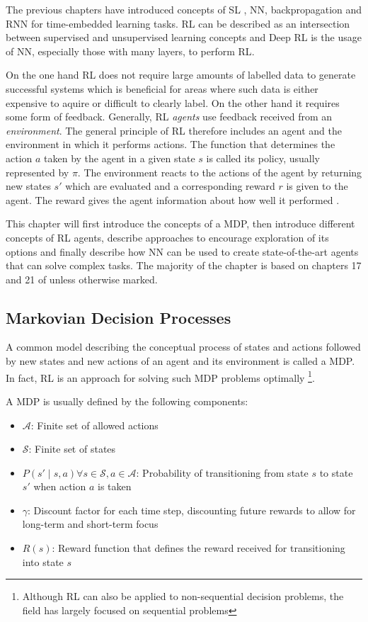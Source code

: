 The previous chapters have introduced concepts of \ac {SL} , \ac {NN}, backpropagation and \ac {RNN} for time-embedded
learning tasks. \ac {RL} can be described as an intersection between supervised and unsupervised learning concepts and
Deep \ac {RL} is the usage of \ac {NN}, especially those with many layers, to perform \ac {RL}.

On the one hand \ac {RL}  does not require large amounts of labelled data to generate successful systems which is
beneficial for areas where such data is either expensive to aquire or difficult to clearly label. On the other hand it
requires some form of feedback. Generally, \ac {RL} \emph{agents} use feedback received from an \emph{environment}.  The
general principle of \ac {RL} therefore includes an agent and the environment in which it performs actions. The function
that determines the action $a$  taken by the agent in a given state $s$ is called its policy, usually represented by
$\pi$.  The environment reacts to the actions of the agent by returning new states $s'$ which are evaluated and a
corresponding reward $r$ is given to the agent. The reward gives the agent information about how well it performed 
\citep[p.830f.]{russell2016artificial}.

This chapter will first introduce the concepts of a \ac {MDP}, then introduce different concepts of \ac {RL} agents,
describe approaches to encourage exploration of its options and finally describe how \ac {NN} can be used to create
state-of-the-art agents that can solve complex tasks. The majority of the chapter is based on
chapters 17 and 21 of \citet[]{russell2016artificial} unless otherwise marked. 

\subsection{Markovian Decision Processes}%
\label{ssub:markovian_decision_processes}

A common model describing the conceptual process of states and actions followed by new states and new actions of an
agent and its environment is called a \acf {MDP}. In fact, \ac {RL} is an approach for solving such \ac {MDP} problems
optimally
\footnote{Although \ac {RL} can also be applied to non-sequential decision problems, the field has largely focused on
sequential problems}.

A \ac {MDP} is usually defined by the following components:

\begin{itemize}
	\item $\mathcal{A}$: Finite set of allowed actions  
	\item $\mathcal{S}$: Finite set of states
	\item $P(s' \mid s,a) \forall s \in \mathcal{S}, a \in \mathcal{A}$: Probability of transitioning from state
	$s$ to state $s'$ when action $a$ is taken
	\item $\gamma$: Discount factor for each time step, discounting future rewards to allow for long-term and
		short-term focus
	\item $R(s)$: Reward function that defines the reward received for transitioning into state $s$
\end{itemize}

